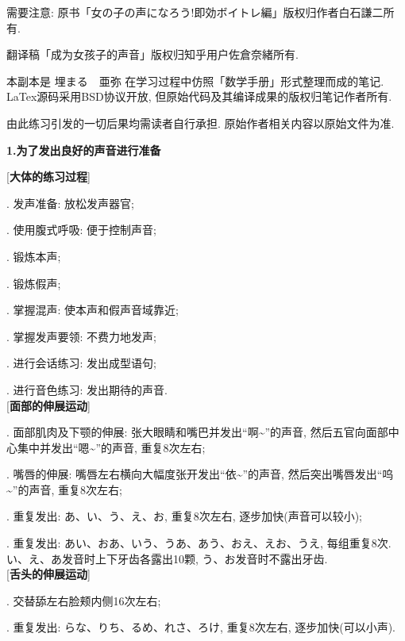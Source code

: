 \clearpage

\quad 需要注意: 原书\mincho 「女の子の声になろう!即効ボイトレ編」\rmfamily 版权归作者\mincho 白石謙二\rmfamily 所有. \par
\quad 翻译稿「成为女孩子的声音」版权归知乎用户\mincho 佐倉奈緒\rmfamily 所有. \par
\quad 本副本是 \mincho 埋まる　亜弥 \rmfamily 在学习过程中仿照「数学手册」形式整理而成的笔记. LaTex源码采用BSD协议开放, 但原始代码及其编译成果的版权归笔记作者所有. \par
\quad 由此练习引发的一切后果均需读者自行承担. 原始作者相关内容以原始文件为准.


\clearpage

\large 
\begin{center}
 \textbf{1.为了发出良好的声音进行准备}
\end{center}

[\textbf{大体的练习过程}] \par
{}. 发声准备: 放松发声器官;\par
{}. 使用腹式呼吸: 便于控制声音;\par
{}. 锻炼本声;\par
{}. 锻炼假声;\par
{}. 掌握混声: 使本声和假声音域靠近;\par
{}. 掌握发声要领: 不费力地发声;\par
{}. 进行会话练习: 发出成型语句;\par
{}. 进行音色练习: 发出期待的声音.\\

[\textbf{面部的伸展运动}]\par
{}. 面部肌肉及下颚的伸展: 张大眼睛和嘴巴并发出``啊\textasciitilde''的声音, 然后五官向面部中心集中并发出``嗯\textasciitilde''的声音, 重复8次左右;\par
{}. 嘴唇的伸展: 嘴唇左右横向大幅度张开发出``依\textasciitilde''的声音, 然后突出嘴唇发出``呜\textasciitilde''的声音, 重复8次左右;\par
{}. 重复发出: あ、い、う、え、お, 重复8次左右, 逐步加快(声音可以较小);\par
{}. 重复发出: あい、おあ、いう、うあ、あう、おえ、えお、うえ, 每组重复8次. い、え、あ发音时上下牙齿各露出10颗, う、お发音时不露出牙齿.\\

[\textbf{舌头的伸展运动}]\par
{}. 交替舔左右脸颊内侧16次左右;\par
{}. 重复发出: らな、りち、るめ、れさ、ろけ, 重复8次左右, 逐步加快(可以小声).\\

